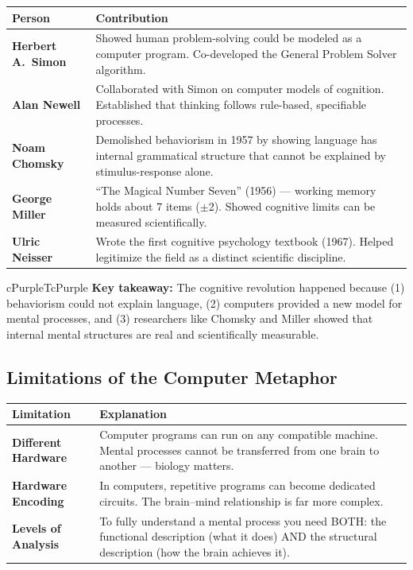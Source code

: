 \documentclass[11pt,a4paper]{article}
\newcommand{\bb}[1]{\textbf{#1}}
\begin{document}
\begin{center}
\renewcommand{\arraystretch}{1.4}
\begin{tabular}{|L{3cm}|L{12.2cm}|}
\hline
{}\color{white}\bb{Person} & \color{white}\bb{Contribution} \\
\hline
\bb{Herbert A.\ Simon} & Showed human problem-solving could be modeled as a computer program. Co-developed the General Problem Solver algorithm. \\
\bb{Alan Newell} & Collaborated with Simon on computer models of cognition. Established that thinking follows rule-based, specifiable processes. \\
\bb{Noam Chomsky} & Demolished behaviorism in 1957 by showing language has internal grammatical structure that cannot be explained by stimulus-response alone. \\
\bb{George Miller} & ``The Magical Number Seven'' (1956) --- working memory holds about 7 items ($\pm$2). Showed cognitive limits can be measured scientifically. \\
\bb{Ulric Neisser} & Wrote the first cognitive psychology textbook (1967). Helped legitimize the field as a distinct scientific discipline. \\
\hline
\end{tabular}
\end{center}

\begin{hintbox}{cPurpleT}{cPurple}
\bb{Key takeaway:} The cognitive revolution happened because (1) behaviorism could not explain language, (2) computers provided a new model for mental processes, and (3) researchers like Chomsky and Miller showed that internal mental structures are real and scientifically measurable.
\end{hintbox}

\subsection*{Limitations of the Computer Metaphor}

\begin{center}
\renewcommand{\arraystretch}{1.4}
\begin{tabular}{|L{3cm}|L{12.2cm}|}
\hline
{}\color{white}\bb{Limitation} & \color{white}\bb{Explanation} \\
\hline
\bb{Different Hardware} & Computer programs can run on any compatible machine. Mental processes cannot be transferred from one brain to another --- biology matters. \\
\bb{Hardware Encoding} & In computers, repetitive programs can become dedicated circuits. The brain--mind relationship is far more complex. \\
\bb{Levels of Analysis} & To fully understand a mental process you need BOTH: the functional description (what it does) AND the structural description (how the brain achieves it). \\
\hline
\end{tabular}
\end{center}
\newpage
\end{document}
